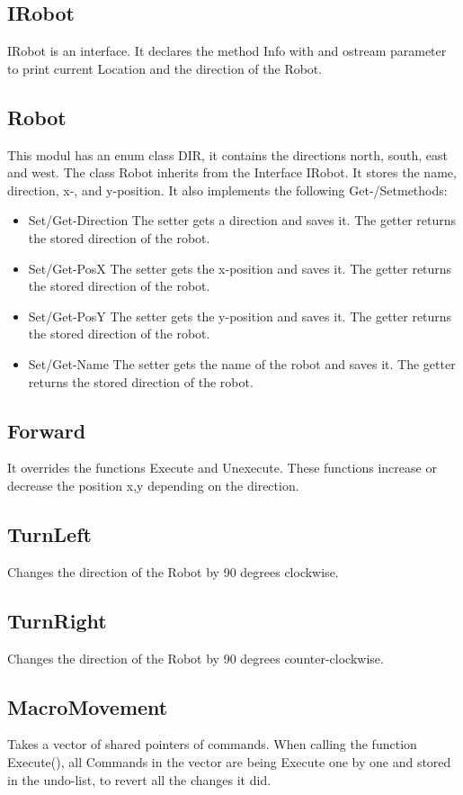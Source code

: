 \subsection{IRobot}
IRobot is an interface. It declares the method Info with and ostream parameter to print current Location and the direction of the Robot.

\subsection{Robot}
This modul has an enum class DIR, it contains the directions north, south, east and west.
The class Robot inherits from the Interface IRobot. It stores the name, direction, x-, and y-position.
It also implements the following Get-/Setmethods:
\begin{itemize}
	\item Set/Get-Direction
	\subitem The setter gets a direction and saves it. The getter returns the stored direction of the robot.
	\item Set/Get-PosX
	\subitem The setter gets the x-position and saves it. The getter returns the stored direction of the robot.
	\item Set/Get-PosY
	\subitem The setter gets the y-position and saves it. The getter returns the stored direction of the robot.
	\item Set/Get-Name
	\subitem The setter gets the name of the robot and saves it. The getter returns the stored direction of the robot.
\end{itemize}

\subsection{Forward}
It overrides the functions Execute and Unexecute.  These functions increase or decrease the position x,y depending on the direction.

\subsection{TurnLeft}
Changes the direction of the Robot by 90 degrees clockwise.

\subsection{TurnRight}
Changes the direction of the Robot by 90 degrees counter-clockwise.

\subsection{MacroMovement}
Takes a vector of shared pointers of commands. When calling the function Execute(), all Commands in the vector are being Execute one by one and stored in the undo-list, to revert all the changes it did.

